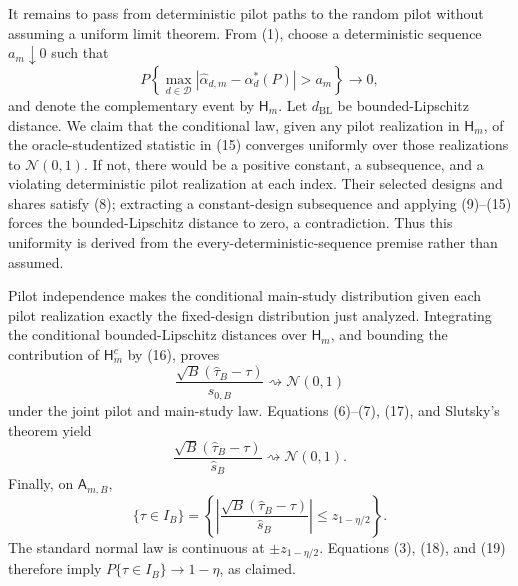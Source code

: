 It remains to pass from deterministic pilot paths to the random pilot without assuming a uniform limit theorem.  From (1), choose a deterministic sequence \(a_m\downarrow0\) such that
\[
 P\left\{
 \max_{d\in\mathcal D}
 |\widehat\alpha_{d,m}-\alpha_d^*(P)|>a_m\right\}
 \longrightarrow0,                                         \tag{16}
\]
and denote the complementary event by \(\mathsf H_m\).  Let \(d_{\mathrm{BL}}\) be bounded-Lipschitz distance.  We claim that the conditional law, given any pilot realization in \(\mathsf H_m\), of the oracle-studentized statistic in (15) converges uniformly over those realizations to \(\mathcal N(0,1)\).  If not, there would be a positive constant, a subsequence, and a violating deterministic pilot realization at each index.  Their selected designs and shares satisfy (8); extracting a constant-design subsequence and applying (9)--(15) forces the bounded-Lipschitz distance to zero, a contradiction.  Thus this uniformity is derived from the every-deterministic-sequence premise rather than assumed.

Pilot independence makes the conditional main-study distribution given each pilot realization exactly the fixed-design distribution just analyzed.  Integrating the conditional bounded-Lipschitz distances over \(\mathsf H_m\), and bounding the contribution of \(\mathsf H_m^c\) by (16), proves
\[
 \frac{\sqrt B(\widehat\tau_B-\tau)}{s_{0,B}}
 \rightsquigarrow\mathcal N(0,1)                           \tag{17}
\]
under the joint pilot and main-study law.  Equations (6)--(7), (17), and Slutsky's theorem yield
\[
 \frac{\sqrt B(\widehat\tau_B-\tau)}{\widehat s_B}
 \rightsquigarrow\mathcal N(0,1).                          \tag{18}
\]
Finally, on \(\mathsf A_{m,B}\),
\[
 \{\tau\in I_B\}
 =\left\{
 \left|\frac{\sqrt B(\widehat\tau_B-\tau)}{\widehat s_B}\right|
 \le z_{1-\eta/2}\right\}.                                \tag{19}
\]
The standard normal law is continuous at \(\pm z_{1-\eta/2}\).  Equations (3), (18), and (19) therefore imply \(P\{\tau\in I_B\}\to1-\eta\), as claimed.